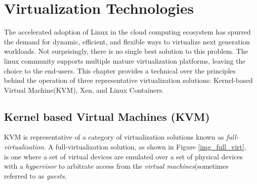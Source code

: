 \chapter{Virtualization Technologies}
The accelerated adoption of Linux in the cloud computing ecosystem has spurred the demand for dynamic, efficient, and flexible ways to virtualize next generation workloads. Not surprisingly, there is no single best solution to this problem. The linux community supports multiple mature virtualization platforms, leaving the choice to the end-users. This chapter provides a technical over the principles behind the operation of three representative virtualization solutions: Kernel-based Virtual Machine(KVM), Xen, and Linux Containers.


\section{Kernel based Virtual Machines (KVM)}

KVM is representative of a category of virtualization solutions known as \emph{full-virtualization}. A full-virtualization solution, as shown in Figure \ref{img_full_virt}, is one where a set of virtual devices are emulated over a set of physical devices with a \emph{hypervisor} to arbitrate access from the \emph{virtual machines}(sometimes referred to as \emph{guests}.


